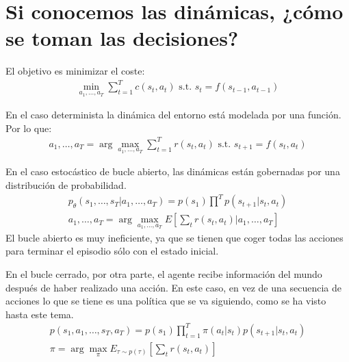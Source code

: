 \section{Si conocemos las dinámicas, ¿cómo se toman las decisiones?}%
\label{sec:si_conocemos_las_dinámicas_cómo_se_toman_las_decisiones_}

El objetivo es minimizar el coste:
\begin{align}
\operatorname { min } _ { a _ { 1 } , \ldots , a _ { T } } \sum _ { t = 1 } ^ { T } c ( s _ { t } , a _ { t } ) \text { s.t. } s _ { t } = f ( s _ { t - 1 } , a _ { t - 1 } )
\end{align}

En el caso determinista la dinámica del entorno está modelada por una función. Por lo que:
\begin{align}
a _ { 1 } , \ldots , a _ { T } = \operatorname { arg } \operatorname { max } _ { a _ { 1 } , \ldots , a _ { T } } \sum _ { t = 1 } ^ { T } r ( s _ { t } , a _ { t } ) \text { s.t. } s _ { t + 1 } = f ( s _ { t } , a _ { t } )
\end{align} 

En el caso estocástico de bucle abierto, las dinámicas están gobernadas por una distribución de
probabilidad. 
\begin{align}
p _ { \theta } ( s _ { 1 } , \ldots , s _ { T } | a _ { 1 } , \ldots , a _ { T } ) = p ( s _ { 1
} ) \prod ^ { T } p ( s _ { t + 1 } | s _ { t } , a _ { t } )\\
a _ { 1 } , \ldots , a _ { T } = \operatorname { arg } \operatorname { max } _ { a _ { 1 } ,
\ldots , a _ { T } } E \left[ \sum _ { t } r ( s _ { t } , a _ { t } ) | a _ { 1 } , \ldots , a _
{ T } \right]
\end{align}
El bucle abierto es muy ineficiente, ya que se tienen que coger todas las acciones para
terminar el episodio sólo con el estado inicial.

En el bucle cerrado, por otra parte, el agente recibe información del mundo después de haber
realizado una acción. En este caso, en vez de una secuencia de acciones lo que se tiene es una
política que se va siguiendo, como se ha visto hasta este tema.
\begin{align}
p ( s _ { 1 } , a _ { 1 } , \ldots , s _ { T } , a _ { T } ) = p ( s _ { 1 } ) \prod _ { t = 1 }
^ { T } \pi ( a _ { t } | s _ { t } ) p ( s _ { t + 1 } | s _ { t } , a _ { t } )\\
\pi = \operatorname { arg } \operatorname { max } _ { \pi } E _ { \tau \sim p ( \tau ) } \left[
    \sum _ { t } r ( s _ { t } , a _ { t } ) \right]
\end{align}

